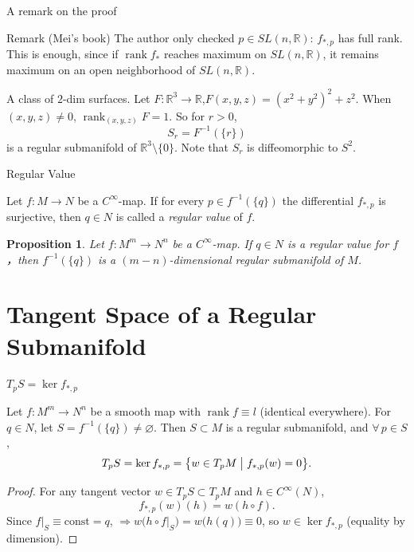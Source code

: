 \documentclass[10pt]{beamer}
\newtheorem{proposition}{Proposition}
\newcommand{\R}{\mathbb{R}}
\DeclareMathOperator{\rank}{rank}
\begin{document}
\begin{frame}{A remark on the proof}
	\begin{block}{Remark (Mei's book)}
		The author only checked $p \in SL(n, \R)$: $f_{*,p}$ has full
		rank. This is enough, since if $\rank f_* $ reaches maximum on
		$SL(n, \R)$, it remains maximum on an open neighborhood of
		$SL(n, \R)$.
	\end{block}
	\bigskip

	\begin{example} A class of $2$-dim surfaces. Let
		$F : \R^3 \to \R$,\quad $F(x, y, z) = (x^2 + y^2)^2 + z^2$.
		When $(x,y,z) \neq 0$, $\rank_{(x,y,z)} F = 1$. So for $r > 0$,
		\[
			S_r = F^{-1}(\{r\})
		\]
		is a regular submanifold of $\R^3 \setminus \{0\}$. Note that
		$S_r$ is diffeomorphic to $S^2$.
	\end{example}
\end{frame}


\begin{frame}{Regular Value}
	\begin{definition}
		Let $f : M \to N$ be a $C^\infty$-map. If for every
		$p \in f^{-1}(\{q\})$ the differential
		$f_{*,p}$ is surjective, then $q \in N$ is called a
		\emph{regular value} of $f$.
	\end{definition}
	\begin{proposition}
		Let  $f : M^m \to N^n$ be a $C^\infty$-map. If $q\in N$ is a
		regular value for $f$，then $f^{-1}(\{q\})$
		is a $(m-n)$-dimensional regular submanifold of $M$.
	\end{proposition}

\end{frame}

\section{Tangent Space of a Regular Submanifold}

\begin{frame}{$T_p S = \ker f_{*,p}$}
	\begin{example} Let $f : M^m \to N^n$ be a smooth map with
		$\rank f \equiv l$ (identical everywhere). For $q \in N$, let
		$S = f^{-1}(\{q\}) \neq \varnothing$. Then $S \subset M$ is a
		regular submanifold, and $\forall\, p \in S$,
		\[
			T_p S = \ker f_{*,p}
			= \bigl\{ w \in T_p M \bigm| f_{*,p}(w) = 0 \bigr\}.
		\]
	\end{example}
	\begin{proof}
		For any tangent vector $w \in T_p S \subset T_p M$ and
		$h \in C^\infty(N)$,
		\[
			f_{*,p}(w)(h) = w(h \circ f).
		\]
		Since $f\big|_S \equiv \mathrm{const} = q$,
		$\Rightarrow w\bigl( h \circ f\big|_S \bigr) = w\bigl(h(q)\bigr)
			\equiv 0$, so $w \in \ker f_{*,p}$ (equality by dimension).
		\qedhere
	\end{proof}
\end{frame}
\end{document}
